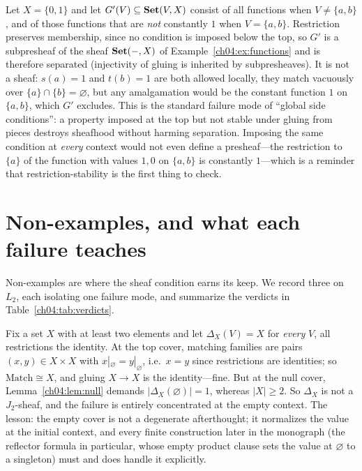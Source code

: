 \begin{example}\label{ch04:ex:bounded}
Let $X=\{0,1\}$ and let $G'(V)\subseteq\mathbf{Set}(V,X)$ consist of all functions
when $V\neq\{a,b\}$, and of those functions that are \emph{not} constantly
$1$ when $V=\{a,b\}$. Restriction preserves membership, since no condition is
imposed below the top, so $G'$ is a subpresheaf of the sheaf $\mathbf{Set}(-,X)$ of
Example~\ref{ch04:ex:functions} and is therefore separated (injectivity of
gluing is inherited by subpresheaves). It is not a sheaf: $s(a)=1$ and
$t(b)=1$ are both allowed locally, they match vacuously over
$\{a\}\cap\{b\}=\varnothing$, but any amalgamation would be the constant
function $1$ on $\{a,b\}$, which $G'$ excludes. This is the standard failure
mode of ``global side conditions'': a property imposed at the top but not
stable under gluing from pieces destroys sheafhood without harming
separation. Imposing the same condition at \emph{every} context would not
even define a presheaf---the restriction to $\{a\}$ of the function with
values $1,0$ on $\{a,b\}$ is constantly $1$---which is a reminder that
restriction-stability is the first thing to check.
\end{example}

\section{Non-examples, and what each failure teaches}\label{ch04:sec:nonexamples}

Non-examples are where the sheaf condition earns its keep. We record three on
$L_2$, each isolating one failure mode, and summarize the verdicts in
Table~\ref{ch04:tab:verdicts}.

\begin{example}\label{ch04:ex:constant}
Fix a set $X$ with at least two elements and let $\Delta_X(V)=X$ for
\emph{every} $V$, all restrictions the identity. At the top cover,
matching families are pairs $(x,y)\in X\times X$ with $x|_\varnothing =
y|_\varnothing$, i.e.\ $x=y$ since restrictions are identities; so
$\mathrm{Match}\cong X$, and gluing $X\to X$ is the identity---fine. But at
the null cover, Lemma~\ref{ch04:lem:null} demands
$|\Delta_X(\varnothing)|=1$, whereas $|X|\ge 2$. So $\Delta_X$ is not a
$J_2$-sheaf, and the failure is entirely concentrated at the empty context.
The lesson: the empty cover is not a degenerate afterthought; it normalizes
the value at the initial context, and every finite construction later in the
monograph (the reflector formula in particular, whose empty product clause
sets the value at $\varnothing$ to a singleton) must and does handle it
explicitly.
\end{example}

